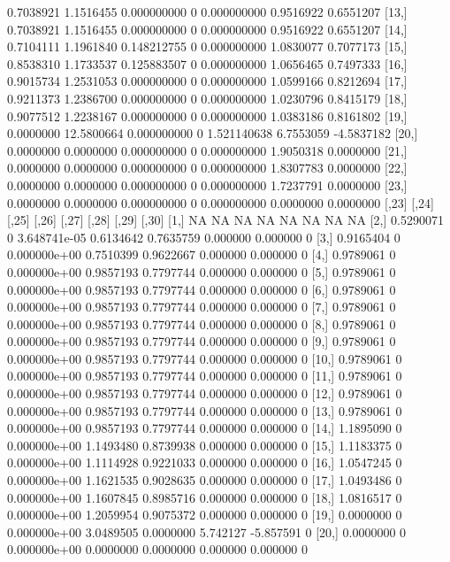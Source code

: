 \documentclass[a4paper]{article}
\begin{document}
\begin{Schunk}
\begin{Soutput}
[12,] 0.7038921  1.1516455 0.000000000     0 0.000000000 0.9516922  0.6551207
[13,] 0.7038921  1.1516455 0.000000000     0 0.000000000 0.9516922  0.6551207
[14,] 0.7104111  1.1961840 0.148212755     0 0.000000000 1.0830077  0.7077173
[15,] 0.8538310  1.1733537 0.125883507     0 0.000000000 1.0656465  0.7497333
[16,] 0.9015734  1.2531053 0.000000000     0 0.000000000 1.0599166  0.8212694
[17,] 0.9211373  1.2386700 0.000000000     0 0.000000000 1.0230796  0.8415179
[18,] 0.9077512  1.2238167 0.000000000     0 0.000000000 1.0383186  0.8161802
[19,] 0.0000000 12.5800664 0.000000000     0 1.521140638 6.7553059 -4.5837182
[20,] 0.0000000  0.0000000 0.000000000     0 0.000000000 1.9050318  0.0000000
[21,] 0.0000000  0.0000000 0.000000000     0 0.000000000 1.8307783  0.0000000
[22,] 0.0000000  0.0000000 0.000000000     0 0.000000000 1.7237791  0.0000000
[23,] 0.0000000  0.0000000 0.000000000     0 0.000000000 0.0000000  0.0000000
          [,23] [,24]        [,25]     [,26]     [,27]    [,28]     [,29] [,30]
 [1,]        NA    NA           NA        NA        NA       NA        NA    NA
 [2,] 0.5290071     0 3.648741e-05 0.6134642 0.7635759 0.000000  0.000000     0
 [3,] 0.9165404     0 0.000000e+00 0.7510399 0.9622667 0.000000  0.000000     0
 [4,] 0.9789061     0 0.000000e+00 0.9857193 0.7797744 0.000000  0.000000     0
 [5,] 0.9789061     0 0.000000e+00 0.9857193 0.7797744 0.000000  0.000000     0
 [6,] 0.9789061     0 0.000000e+00 0.9857193 0.7797744 0.000000  0.000000     0
 [7,] 0.9789061     0 0.000000e+00 0.9857193 0.7797744 0.000000  0.000000     0
 [8,] 0.9789061     0 0.000000e+00 0.9857193 0.7797744 0.000000  0.000000     0
 [9,] 0.9789061     0 0.000000e+00 0.9857193 0.7797744 0.000000  0.000000     0
[10,] 0.9789061     0 0.000000e+00 0.9857193 0.7797744 0.000000  0.000000     0
[11,] 0.9789061     0 0.000000e+00 0.9857193 0.7797744 0.000000  0.000000     0
[12,] 0.9789061     0 0.000000e+00 0.9857193 0.7797744 0.000000  0.000000     0
[13,] 0.9789061     0 0.000000e+00 0.9857193 0.7797744 0.000000  0.000000     0
[14,] 1.1895090     0 0.000000e+00 1.1493480 0.8739938 0.000000  0.000000     0
[15,] 1.1183375     0 0.000000e+00 1.1114928 0.9221033 0.000000  0.000000     0
[16,] 1.0547245     0 0.000000e+00 1.1621535 0.9028635 0.000000  0.000000     0
[17,] 1.0493486     0 0.000000e+00 1.1607845 0.8985716 0.000000  0.000000     0
[18,] 1.0816517     0 0.000000e+00 1.2059954 0.9075372 0.000000  0.000000     0
[19,] 0.0000000     0 0.000000e+00 3.0489505 0.0000000 5.742127 -5.857591     0
[20,] 0.0000000     0 0.000000e+00 0.0000000 0.0000000 0.000000  0.000000     0

\end{Soutput}
\end{Schunk}
\end{document}
